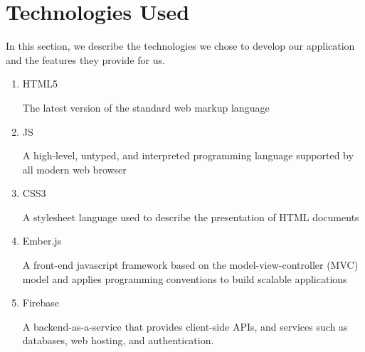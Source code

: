 \section{Technologies Used}
In this section, we describe the technologies we chose to develop our application and the features they provide for us.
\begin{enumerate}
\item HTML5 \par The latest version of the standard web markup language
\item JS \par A high-level, untyped, and interpreted programming  language supported by all modern web browser
\item CSS3 \par A stylesheet language used to describe the presentation of HTML documents
\item Ember.js \par A front-end javascript framework based on the model-view-controller (MVC) model and applies programming conventions to build scalable applications
\item  Firebase \par A backend-as-a-service that provides client-side APIs, and services such as databases, web hosting, and authentication.
\end{enumerate}

